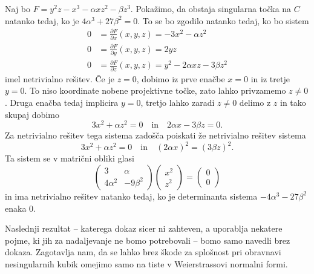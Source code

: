 \documentclass[mat1]{fmfdelo}
\numberwithin{equation}{section}
\newcommand{\pdv}[2][]{\frac{\partial#1}{\partial#2}}
\theoremstyle{definition}
\begin{document}
\begin{dokaz}
    Naj bo $F = y^2z - x^3 - \alpha xz^2 - \beta z^3$. Pokažimo, da obstaja singularna točka na $C$ natanko tedaj, ko je $4\alpha^3 + 27\beta^2 = 0$. To se bo zgodilo natanko tedaj, ko bo sistem
    \begin{align*}
        0 &= \pdv[F]{x}{}(x,y,z) = -3x^2 - \alpha z^2\\
        0 &= \pdv[F]{y}{}(x,y,z) = 2yz\\
        0 &= \pdv[F]{z}{}(x,y,z) = y^2 - 2\alpha xz - 3 \beta z^2
    \end{align*}
    imel netrivialno rešitev. Če je $z = 0$, dobimo iz prve enačbe $x = 0$ in iz tretje $y = 0$. To niso koordinate nobene projektivne točke, zato lahko privzamemo $z \neq 0$. Druga enačba tedaj implicira $y = 0$, tretjo lahko zaradi $z \neq 0$ delimo z $z$ in tako skupaj dobimo
    \[
        3x^2 + \alpha z^2 = 0 \quad \text{in} \quad 2\alpha x - 3 \beta z = 0.   
    \]
    Za netrivialno rešitev tega sistema zadošča poiskati že netrivialno rešitev sistema
    \[
        3x^2 + \alpha z^2 = 0 \quad \text{in} \quad (2\alpha x)^2 = (3 \beta z)^2. 
    \]
    Ta sistem se v matrični obliki glasi
    \[
        \begin{pmatrix}
            3 & \alpha \\
            4\alpha^2 & -9\beta^2
        \end{pmatrix} 
        \begin{pmatrix}
            x^2 \\
            z^2
        \end{pmatrix}
        =
        \begin{pmatrix}
            0 \\
            0
        \end{pmatrix}
    \]
    in ima netrivialno rešitev natanko tedaj, ko je determinanta sistema $-4\alpha^3 - 27\beta^2$ enaka $0$. 
\end{dokaz}


Naslednji rezultat -- katerega dokaz sicer ni zahteven, a uporablja nekatere pojme, ki jih za nadaljevanje ne bomo potrebovali -- bomo samo navedli brez dokaza. Zagotavlja nam, da se lahko brez škode za splošnost pri obravnavi nesingularnih kubik omejimo samo na tiste v Weierstrassovi normalni formi. 
\end{document}
